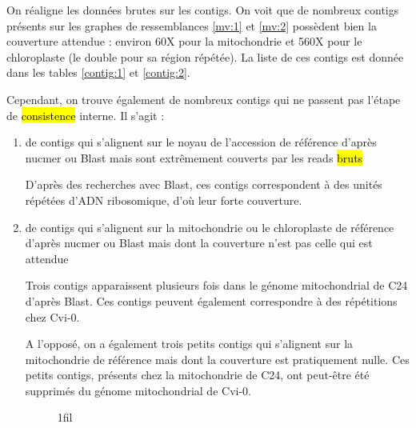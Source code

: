 \documentclass[a4paper]{article}
\makeatletter
\newcommand{\rewrite}[1]{\todo[color=green!40]{#1}}
\newcommand{\hlrewrite}[2]{\sethlcolor{green} \hl{#1} \rewrite{#2}}
\newcommand*{\centerfloat}{%
  \parindent \z@
  \leftskip \z@ \@plus 1fil \@minus \textwidth
  \rightskip\leftskip
  \parfillskip \z@skip}
\makeatother
\begin{document}
On réaligne les données brutes sur les contigs. On voit que de nombreux contigs présents sur les graphes de ressemblances \ref{mv:1} et \ref{mv:2} possèdent bien la couverture attendue : environ 60X pour la mitochondrie et 560X pour le chloroplaste (le double pour sa région répétée). La liste de ces contigs est donnée dans les tables \ref{contig:1} et \ref{contig:2}. 

Cependant, on trouve également de nombreux contigs qui ne passent pas l'étape de \hlrewrite{consistence}{consistance} interne. Il s'agit : 
\begin{enumerate}
	\item de contigs qui s'alignent sur le noyau de l'accession de référence d'après nucmer ou Blast mais sont extrêmement couverts par les reads \hlrewrite{bruts}{brutes} 

D'après des recherches avec Blast, ces contigs correspondent à des unités répétées d'ADN ribosomique, d'où leur forte couverture.

\item de contigs qui s'alignent sur la mitochondrie ou le chloroplaste de référence d'après nucmer ou Blast mais dont la couverture n'est pas celle qui est attendue

Trois contigs apparaissent plusieurs fois dans le génome mitochondrial de C24 d'après Blast. Ces contigs peuvent également correspondre à des répétitions chez Cvi-0. 

A l'opposé, on a également trois petits contigs qui s'alignent sur la mitochondrie de référence mais dont la couverture est pratiquement nulle. Ces petits contigs, présents chez la mitochondrie de C24, ont peut-être été supprimés du génome mitochondrial de Cvi-0.

\begin{figure}[!ht]
\centerfloat

 \hspace{5mm}
\end{figure}
\end{enumerate}
\end{document}
